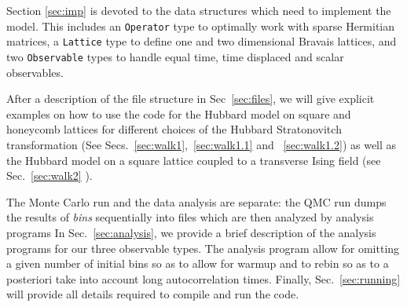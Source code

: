 	   Section \ref{sec:imp} is devoted to the data structures which  need to implement the model.  This includes  an \texttt{Operator} type to  optimally work with sparse Hermitian matrices, a \texttt{Lattice} type  to define one and two dimensional Bravais lattices, and   two   \texttt{Observable} types to handle equal time, time displaced and scalar observables. 
	   
	    After a description of the file structure  in Sec~\ref{sec:files},  we will give explicit examples on how to use the code for  the  Hubbard model on square and honeycomb lattices  for different choices of the Hubbard  Stratonovitch transformation  (See Secs.~\ref{sec:walk1},~\ref{sec:walk1.1} and ~\ref{sec:walk1.2})  as well as the Hubbard model on a square lattice coupled to a transverse Ising field (see Sec.~\ref{sec:walk2} ).  
	   
      The Monte Carlo run and the  data analysis  are separate: the QMC run  dumps the results of {\it bins}  sequentially into files  which are then analyzed by  analysis programs In Sec.~\ref{sec:analysis}, we provide a brief description of the analysis programs  for our three observable types.  The analysis program allow for omitting a given number of initial bins so as to allow for warmup and to rebin  so as to a posteriori take into account long autocorrelation times.  Finally, Sec.~\ref{sec:running}  will provide all details required to compile and run the code. 
	
		
				


